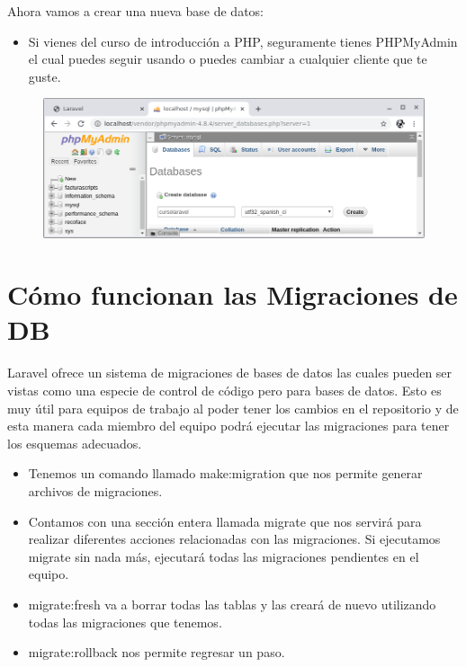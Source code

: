 \documentclass{article}
\begin{document}
Ahora vamos a crear una nueva base de datos:

\begin{itemize}
  \item Si vienes del curso de introducción a PHP, seguramente tienes
    PHPMyAdmin el cual puedes seguir usando o puedes cambiar a cualquier
    cliente que te guste.
\end{itemize}

\begin{figure}[h!]
  \centering
  \includegraphics[scale=0.5]{./Pictures/022_bd.png}
\end{figure}

\newpage


\section{Cómo funcionan las Migraciones de DB}%
Laravel ofrece un sistema de migraciones de bases de datos las cuales pueden
ser vistas como una especie de control de código pero para bases de datos. Esto
es muy útil para equipos de trabajo al poder tener los cambios en el
repositorio y de esta manera cada miembro del equipo podrá ejecutar las
migraciones para tener los esquemas adecuados.\\

\begin{itemize}
  \item Tenemos un comando llamado make:migration que nos permite generar
    archivos de migraciones.
  \item Contamos con una sección entera llamada migrate que nos servirá para
    realizar diferentes acciones relacionadas con las migraciones. Si
    ejecutamos migrate sin nada más, ejecutará todas las migraciones pendientes
    en el equipo.
  \item migrate:fresh va a borrar todas las tablas y las creará de nuevo
    utilizando todas las migraciones que tenemos.
  \item migrate:rollback nos permite regresar un paso.
\end{itemize}
\end{document}
